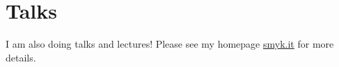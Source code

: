 \documentclass[11pt,a4paper,sans]{moderncv}        %
\begin{document}
\section{Talks}
I am also doing talks and lectures! Please see my homepage \href{smyk.it}{smyk.it} for more details.

\nocite{*}


\end{document}

